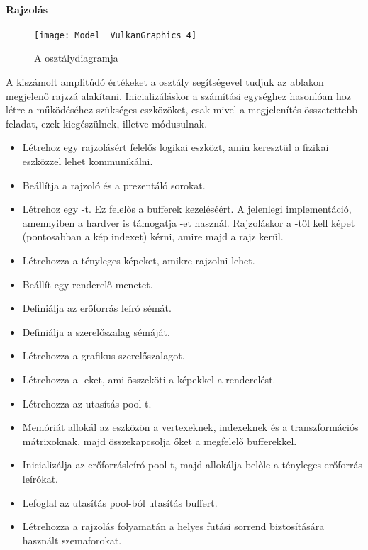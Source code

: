 \paragraph{Rajzol\'as}
\begin{figure}[h]
	\texttt{[image: Model\_\_VulkanGraphics\_4]}
	\centering
	\caption{A  oszt\'alydiagramja}
\end{figure}
A kisz\'amolt amplit\'ud\'o \'ert\'ekeket a  oszt\'aly seg\'its\'egevel tudjuk az ablakon megjelen\H o rajzz\'a alak\'itani. 
Inicializ\'al\'askor a sz\'am\'it\'asi egys\'eghez hasonl\'oan hoz l\'etre a m\H uk\"od\'es\'ehez sz\"uks\'eges eszk\"oz\"oket, csak mivel a megjelen\'it\'es \"osszetettebb feladat, ezek kieg\'esz\"ulnek, illetve m\'odusulnak.
\begin{itemize}
	\item L\'etrehoz egy rajzol\'as\'ert felel\H os logikai eszk\"ozt, amin kereszt\"ul a fizikai eszk\"ozzel lehet kommunik\'alni.
	\item Be\'all\'itja a rajzol\'o \'es a prezent\'al\'o sorokat.
	\item L\'etrehoz egy -t. Ez felel\H os a bufferek kezel\'es\'e\'ert. A jelenlegi implement\'aci\'o, amennyiben a hardver is t\'amogatja -et haszn\'al. Rajzol\'askor a -t\H ol kell k\'epet (pontosabban a k\'ep indexet) k\'erni, amire majd a rajz ker\"ul.
	\item L\'etrehozza a t\'enyleges k\'epeket, amikre rajzolni lehet.
	\item Be\'all\'it egy renderel\H o menetet.
	\item Defini\'alja az er\H oforr\'as le\'ir\'o s\'em\'at.
	\item Defini\'alja a szerel\H oszalag s\'em\'aj\'at.
	\item L\'etrehozza a grafikus szerel\H oszalagot.
	\item L\'etrehozza a -eket, ami \"osszek\"oti a k\'epekkel a renderel\'est.
	\item L\'etrehozza az utas\'it\'as pool-t.
	\item Mem\'ori\'at allok\'al az eszk\"oz\"on a vertexeknek, indexeknek \'es a transzform\'aci\'os m\'atrixoknak, majd \"osszekapcsolja \H oket a megfelel\H o bufferekkel.
	\item Inicializ\'alja az er\H oforr\'asle\'ir\'o pool-t, majd allok\'alja bel\H ole a t\'enyleges er\H oforr\'as le\'ir\'okat.
	\item Lefoglal az utas\'it\'as pool-b\'ol utas\'it\'as buffert.
	\item L\'etrehozza a rajzol\'as folyamat\'an a helyes fut\'asi sorrend biztos\'it\'as\'ara haszn\'alt szemaforokat. 
\end{itemize}
